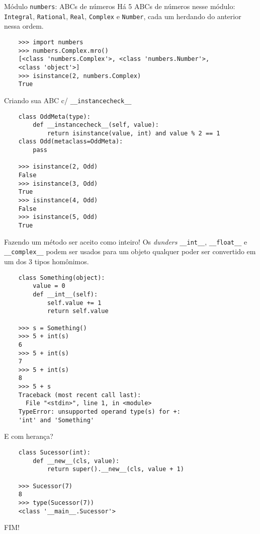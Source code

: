\documentclass[utf8]{beamer}
\begin{document}
\begin{frame}[fragile]{Módulo \texttt{numbers}: ABCs de números}
  Há 5 ABCs de números nesse módulo:
  \texttt{Integral},
  \texttt{Rational},
  \texttt{Real},
  \texttt{Complex} e
  \texttt{Number},
  cada um herdando do anterior nessa ordem.

  \begin{verbatim}
    >>> import numbers
    >>> numbers.Complex.mro()
    [<class 'numbers.Complex'>, <class 'numbers.Number'>,
    <class 'object'>]
    >>> isinstance(2, numbers.Complex)
    True
  \end{verbatim}

\end{frame}


\begin{frame}[fragile]{Criando sua ABC c/
                       \texttt{\_\_instancecheck\_\_}}
  \begin{verbatim}
    class OddMeta(type):
        def __instancecheck__(self, value):
            return isinstance(value, int) and value % 2 == 1
    class Odd(metaclass=OddMeta):
        pass

    >>> isinstance(2, Odd)
    False
    >>> isinstance(3, Odd)
    True
    >>> isinstance(4, Odd)
    False
    >>> isinstance(5, Odd)
    True
  \end{verbatim}
\end{frame}


\begin{frame}[fragile]{Fazendo um método ser aceito como inteiro!}
  Os \emph{dunders}
  \texttt{__int__},
  \texttt{__float__} e
  \texttt{__complex__}
  podem ser usados para um objeto qualquer
  poder ser convertido em um dos $3$ tipos homônimos.

  \begin{verbatim}
    class Something(object):
        value = 0
        def __int__(self):
            self.value += 1
            return self.value

    >>> s = Something()
    >>> 5 + int(s)
    6
    >>> 5 + int(s)
    7
    >>> 5 + int(s)
    8
    >>> 5 + s
    Traceback (most recent call last):
      File "<stdin>", line 1, in <module>
    TypeError: unsupported operand type(s) for +:
    'int' and 'Something'
  \end{verbatim}
\end{frame}


\begin{frame}[fragile]{E com herança?}

  \begin{verbatim}
    class Sucessor(int):
        def __new__(cls, value):
            return super().__new__(cls, value + 1)

    >>> Sucessor(7)
    8
    >>> type(Sucessor(7))
    <class '__main__.Sucessor'>
  \end{verbatim}
\end{frame}


\begin{frame}
  \begin{center}\fontsize{5cm}{2.5cm}\selectfont
    FIM!
  \end{center}
\end{frame}
\end{document}

